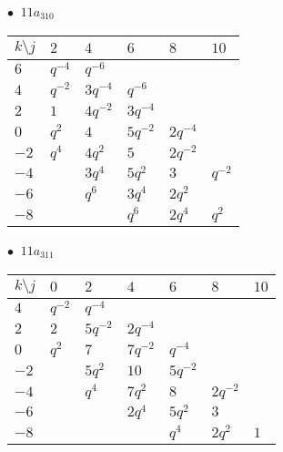 \begin{minipage}{\linewidth}
$\bullet\ $ $11a_{310}$ \vspace{0.5em} \\
\begin{tabular}{l|lllll}
$k \setminus j$ & $2$ & $4$ & $6$ & $8$ & $10$ \\
\hline
$6$ & $q^{-4}$ & $q^{-6}$ &  &  &  \\
$4$ & $q^{-2}$ & $3q^{-4}$ & $q^{-6}$ &  &  \\
$2$ & $1$ & $4q^{-2}$ & $3q^{-4}$ &  &  \\
$0$ & $q^{2}$ & $4$ & $5q^{-2}$ & $2q^{-4}$ &  \\
$-2$ & $q^{4}$ & $4q^{2}$ & $5$ & $2q^{-2}$ &  \\
$-4$ &  & $3q^{4}$ & $5q^{2}$ & $3$ & $q^{-2}$ \\
$-6$ &  & $q^{6}$ & $3q^{4}$ & $2q^{2}$ &  \\
$-8$ &  &  & $q^{6}$ & $2q^{4}$ & $q^{2}$ \\
\end{tabular}
\vspace{2em}
\end{minipage}
%
\begin{minipage}{\linewidth}
$\bullet\ $ $11a_{311}$ \vspace{0.5em} \\
\begin{tabular}{l|llllll}
$k \setminus j$ & $0$ & $2$ & $4$ & $6$ & $8$ & $10$ \\
\hline
$4$ & $q^{-2}$ & $q^{-4}$ &  &  &  &  \\
$2$ & $2$ & $5q^{-2}$ & $2q^{-4}$ &  &  &  \\
$0$ & $q^{2}$ & $7$ & $7q^{-2}$ & $q^{-4}$ &  &  \\
$-2$ &  & $5q^{2}$ & $10$ & $5q^{-2}$ &  &  \\
$-4$ &  & $q^{4}$ & $7q^{2}$ & $8$ & $2q^{-2}$ &  \\
$-6$ &  &  & $2q^{4}$ & $5q^{2}$ & $3$ &  \\
$-8$ &  &  &  & $q^{4}$ & $2q^{2}$ & $1$ \\
\end{tabular}
\vspace{2em}
\end{minipage}
%
